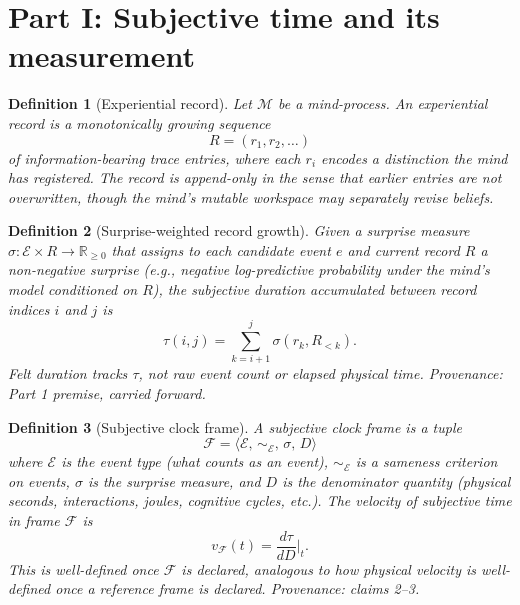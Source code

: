 \documentclass[11pt]{article}
\newtheorem{definition}{Definition}
\begin{document}
\section{Part I: Subjective time and its measurement}

\begin{definition}[Experiential record]
\label{def:record}
Let $\mathcal{M}$ be a mind-process. An \emph{experiential record} is a monotonically growing sequence
\[
  R = (r_1, r_2, \ldots)
\]
of information-bearing trace entries, where each $r_i$ encodes a distinction the mind has registered. The record is \emph{append-only} in the sense that earlier entries are not overwritten, though the mind's mutable workspace may separately revise beliefs.
\end{definition}

\begin{definition}[Surprise-weighted record growth]
\label{def:subjtime}
Given a surprise measure $\sigma\colon \mathcal{E}\times R \to \mathbb{R}_{\geq 0}$ that assigns to each candidate event $e$ and current record $R$ a non-negative surprise (e.g., negative log-predictive probability under the mind's model conditioned on $R$), the \emph{subjective duration} accumulated between record indices $i$ and $j$ is
\[
  \tau(i,j) = \sum_{k=i+1}^{j} \sigma(r_k, R_{<k}).
\]
Felt duration tracks $\tau$, not raw event count or elapsed physical time.
\emph{Provenance: Part 1 premise, carried forward.}
\end{definition}

\begin{definition}[Subjective clock frame]
\label{def:frame}
A \emph{subjective clock frame} is a tuple
\[
  \mathcal{F} = \langle \mathcal{E},\, \sim_{\mathcal{E}},\, \sigma,\, D \rangle
\]
where $\mathcal{E}$ is the event type (what counts as an event), $\sim_{\mathcal{E}}$ is a sameness criterion on events, $\sigma$ is the surprise measure, and $D$ is the denominator quantity (physical seconds, interactions, joules, cognitive cycles, etc.). The \emph{velocity of subjective time} in frame $\mathcal{F}$ is
\[
  v_{\mathcal{F}}(t) = \frac{d\tau}{dD}\bigg|_t.
\]
This is well-defined once $\mathcal{F}$ is declared, analogous to how physical velocity is well-defined once a reference frame is declared.
\emph{Provenance: claims 2--3.}
\end{definition}
\end{document}
